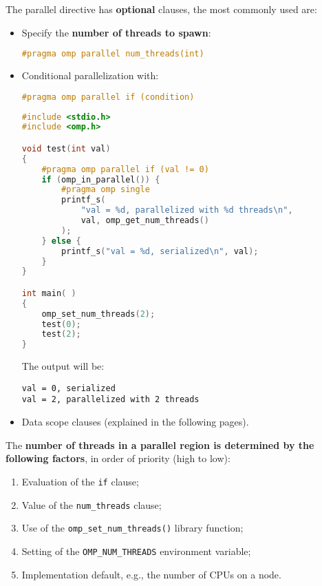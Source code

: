 \noindent
The parallel directive has \textbf{optional} clauses, the most commonly used are:
\begin{itemize}
    \item Specify the \textbf{number of threads to spawn}:
    \begin{lstlisting}[language=C++]
#pragma omp parallel num_threads(int)\end{lstlisting}

	\newpage

    \item Conditional parallelization with:
\begin{lstlisting}[language=C++]
#pragma omp parallel if (condition)\end{lstlisting}
    \begin{examplebox}
\begin{lstlisting}[language=C++]
#include <stdio.h>
#include <omp.h>

void test(int val)
{
    #pragma omp parallel if (val != 0)
    if (omp_in_parallel()) {
        #pragma omp single
        printf_s(
            "val = %d, parallelized with %d threads\n",
            val, omp_get_num_threads()
        );
    } else {
        printf_s("val = %d, serialized\n", val);
    }
}

int main( )
{
    omp_set_num_threads(2);
    test(0);
    test(2);
}\end{lstlisting}
    The output will be:
\begin{lstlisting}
val = 0, serialized
val = 2, parallelized with 2 threads\end{lstlisting}
    \end{examplebox}

    \item Data scope clauses (explained in the following pages).
\end{itemize}
The \textbf{number of threads in a parallel region is determined by the following factors}, in order of priority (high to low):
\begin{enumerate}
    \item Evaluation of the \texttt{if} clause;
    \item Value of the \texttt{num\_threads} clause;
    \item Use of the \texttt{omp\_set\_num\_threads()} library function;
    \item Setting of the \texttt{OMP\_NUM\_THREADS} environment variable;
    \item Implementation default, e.g., the number of CPUs on a node.
\end{enumerate}

